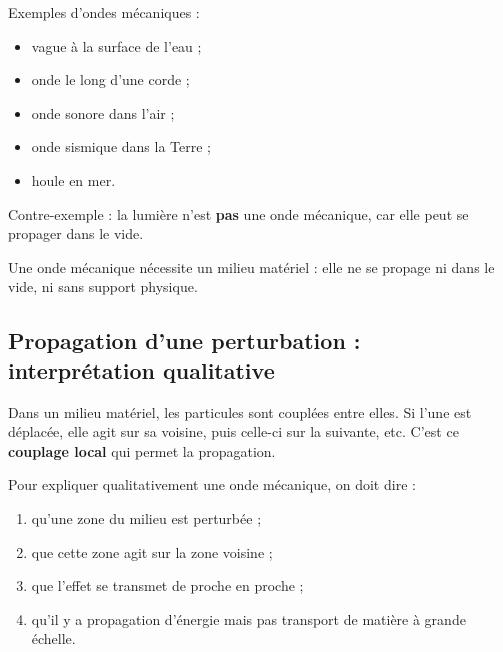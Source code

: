 \documentclass[11pt,a4paper]{article}
\begin{document}
\begin{exemplebox}
Exemples d'ondes mécaniques :
\begin{itemize}
    \item vague à la surface de l'eau ;
    \item onde le long d'une corde ;
    \item onde sonore dans l'air ;
    \item onde sismique dans la Terre ;
    \item houle en mer.
\end{itemize}
Contre-exemple : la lumière n'est \textbf{pas} une onde mécanique, car elle peut se propager dans le vide.
\end{exemplebox}

\begin{center}
\end{center}

\begin{propriete}
Une onde mécanique nécessite un milieu matériel : elle ne se propage ni dans le vide, ni sans support physique.
\end{propriete}

\subsection{Propagation d'une perturbation : interprétation qualitative}
Dans un milieu matériel, les particules sont couplées entre elles. Si l'une est déplacée, elle agit sur sa voisine, puis celle-ci sur la suivante, etc. C'est ce \textbf{couplage local} qui permet la propagation.

\begin{methode}
Pour expliquer qualitativement une onde mécanique, on doit dire :
\begin{enumerate}
    \item qu'une zone du milieu est perturbée ;
    \item que cette zone agit sur la zone voisine ;
    \item que l'effet se transmet de proche en proche ;
    \item qu'il y a propagation d'énergie mais pas transport de matière à grande échelle.
\end{enumerate}
\end{methode}
\end{document}
